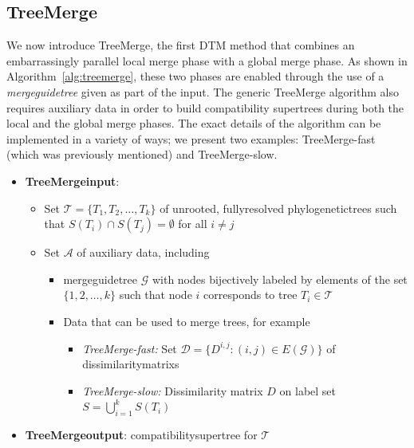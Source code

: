 \subsection{TreeMerge}
\label{sec:treemerge}
We now introduce TreeMerge, the first DTM method that combines an embarrassingly parallel local merge phase with a global merge phase.
As shown in Algorithm~\ref{alg:treemerge}, these two phases are enabled through the use of a \textit{\gls{mergeguidetree}} given as part of the input.
The generic TreeMerge algorithm also requires auxiliary data in order to build compatibility supertrees during both the local and the global merge phases.
The exact details of the algorithm can be implemented in a variety of ways; we present two examples: TreeMerge-fast (which was previously mentioned) and TreeMerge-slow.

\begin{itemize}
	\item \textbf{\gls{TreeMergeinput}}: 
	\begin{itemize}
		\item Set $\mathcal{T} = \{T_1, T_2, \dots, T_k\}$ of \gls{unrooted}, \gls{fullyresolved} \glspl{phylogenetictree} such that $S(T_i) \cap S(T_j) = \emptyset$ for all $i \ne j$
		\item Set $\mathcal{A}$ of auxiliary data, including
		\begin{itemize}
			\item \Gls{mergeguidetree} $\mathcal{G}$ with nodes bijectively labeled by elements of the set $\{1, 2, \dots, k\}$ such  that node $i$ corresponds to tree $T_i \in \mathcal{T}$
			\item Data that can be used to merge trees, for example
			\begin{itemize}
				\item {\em TreeMerge-fast:} Set $\mathcal{D} = \{ D^{i,j} : (i,j) \in E(\mathcal{G}) \}$ of \glspl{dissimilaritymatrix}
				\item {\em TreeMerge-slow:} Dissimilarity matrix $D$ on label set $S = \bigcup_{i=1}^k S(T_i)$
			\end{itemize}
		\end{itemize}
	\end{itemize}
	\item \textbf{\gls{TreeMergeoutput}}: \Gls{compatibilitysupertree} for $\mathcal{T}$ %
\end{itemize}

